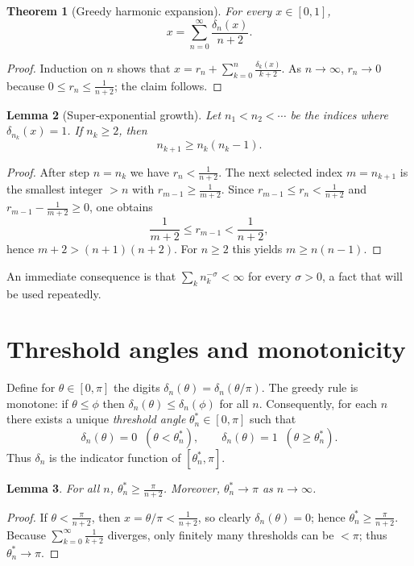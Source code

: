 \documentclass[12pt,a4paper]{article}
\newtheorem{theorem}{Theorem}[section]
\newtheorem{lemma}[theorem]{Lemma}
\theoremstyle{remark}
\begin{document}
\begin{theorem}[Greedy harmonic expansion]\label{thm:greedy}
For every $x\in[0,1]$,
\[
x = \sum_{n=0}^{\infty} \frac{\delta_n(x)}{n+2}.
\]
\end{theorem}
\begin{proof}
Induction on $n$ shows that $x = r_n + \sum_{k=0}^n \frac{\delta_k(x)}{k+2}$.
As $n\to\infty$, $r_n\to0$ because $0\le r_n\le \frac1{n+2}$; the claim follows.
\end{proof}

\begin{lemma}[Super‑exponential growth]\label{lem:growth}
Let $n_1<n_2<\cdots$ be the indices where $\delta_{n_k}(x)=1$.
If $n_k\ge2$, then
\[
n_{k+1} \ge n_k (n_k - 1).
\]
\end{lemma}
\begin{proof}
After step $n=n_k$ we have $r_n<\frac1{n+2}$.
The next selected index $m=n_{k+1}$ is the smallest integer $>n$ with $r_{m-1}\ge\frac1{m+2}$.
Since $r_{m-1} \le r_n < \frac1{n+2}$ and $r_{m-1}-\frac1{m+2}\ge0$, one obtains
\[
\frac1{m+2} \le r_{m-1} < \frac1{n+2},
\]
hence $m+2 > (n+1)(n+2)$.  For $n\ge2$ this yields $m \ge n(n-1)$.
\end{proof}

An immediate consequence is that $\sum_{k} n_k^{-\sigma}<\infty$ for every $\sigma>0$, a fact that will be used repeatedly.

\section{Threshold angles and monotonicity}
\label{sec:threshold}

Define for $\theta\in[0,\pi]$ the digits $\delta_n(\theta)=\delta_n(\theta/\pi)$.
The greedy rule is monotone:
if $\theta\le\phi$ then $\delta_n(\theta)\le\delta_n(\phi)$ for all $n$.
Consequently, for each $n$ there exists a unique \emph{threshold angle} $\theta_n^*\in[0,\pi]$ such that
\[
\delta_n(\theta)=0\;\;(\theta<\theta_n^*),\qquad
\delta_n(\theta)=1\;\;(\theta\ge\theta_n^*).
\]
Thus $\delta_n$ is the indicator function of $[\theta_n^*,\pi]$.

\begin{lemma}\label{lem:thresh}
For all $n$, $\theta_n^* \ge \frac{\pi}{n+2}$.
Moreover, $\theta_n^* \to \pi$ as $n\to\infty$.
\end{lemma}
\begin{proof}
If $\theta < \frac{\pi}{n+2}$, then $x=\theta/\pi < \frac1{n+2}$, so clearly $\delta_n(\theta)=0$;
hence $\theta_n^*\ge \frac{\pi}{n+2}$.
Because $\sum_{k=0}^\infty \frac1{k+2}$ diverges, only finitely many thresholds can be $<\pi$;
thus $\theta_n^*\to\pi$.
\end{proof}
\end{document}
